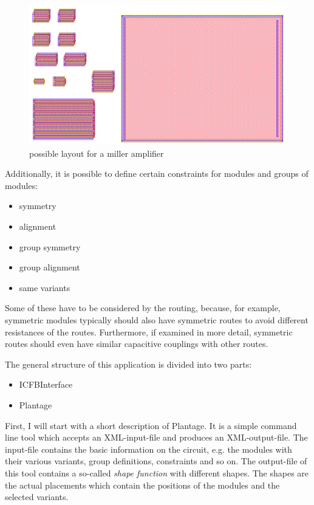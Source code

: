 \begin{figure}
	\centering
	\includegraphics[scale=0.4]{FIG/miller_amplifier_layout.png}
	\caption{possible layout for a miller amplifier}
	\label{fig:miller_amplifier_layout}
\end{figure}

Additionally, it is possible to define certain constraints for modules and groups of modules:

\begin{itemize}
\item symmetry
\item alignment
\item group symmetry
\item group alignment
\item same variants
\end{itemize}

Some of these have to be considered by the routing, because, for example, symmetric modules typically should also have symmetric routes to avoid different resistances of the routes. Furthermore, if examined in more detail, symmetric routes should even have similar capacitive couplings with other routes.

The general structure of this application is divided into two parts:
\begin{itemize}
\item ICFBInterface
\item Plantage
\end{itemize}

First, I will start with a short description of Plantage. It is a simple command line tool which accepts an XML-input-file and produces an XML-output-file. The input-file contains the basic information on the circuit, e.g. the modules with their various variants, group definitions, constraints and so on. The output-file of this tool contains a so-called \emph{shape function} with different shapes. The shapes are the actual placements which contain the positions of the modules and the selected variants.

